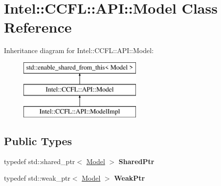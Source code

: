 \hypertarget{classIntel_1_1CCFL_1_1API_1_1Model}{}\section{Intel\+:\+:C\+C\+F\+L\+:\+:A\+P\+I\+:\+:Model Class Reference}
\label{classIntel_1_1CCFL_1_1API_1_1Model}
Inheritance diagram for Intel\+:\+:C\+C\+F\+L\+:\+:A\+P\+I\+:\+:Model\+:\begin{figure}[H]
\begin{center}
\leavevmode
\includegraphics[height=3.000000cm]{classIntel_1_1CCFL_1_1API_1_1Model}
\end{center}
\end{figure}
\subsection*{Public Types}
\begin{DoxyCompactItemize}
\item 
\hypertarget{classIntel_1_1CCFL_1_1API_1_1Model_aa1c5686fbac89152ae6abaabfa8b181a}{}typedef std\+::shared\+\_\+ptr$<$ \hyperlink{classIntel_1_1CCFL_1_1API_1_1Model}{Model} $>$ {\bfseries Shared\+Ptr}\label{classIntel_1_1CCFL_1_1API_1_1Model_aa1c5686fbac89152ae6abaabfa8b181a}

\item 
\hypertarget{classIntel_1_1CCFL_1_1API_1_1Model_adaae0c4043566501c3bcf2a95c09ee52}{}typedef std\+::weak\+\_\+ptr$<$ \hyperlink{classIntel_1_1CCFL_1_1API_1_1Model}{Model} $>$ {\bfseries Weak\+Ptr}\label{classIntel_1_1CCFL_1_1API_1_1Model_adaae0c4043566501c3bcf2a95c09ee52}

\end{DoxyCompactItemize}
